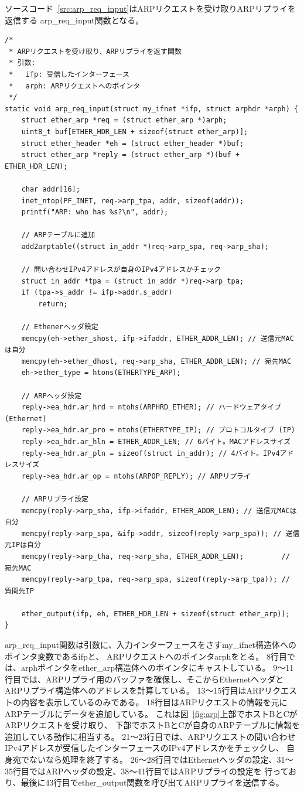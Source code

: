 ソースコード~\ref{src:arp_req_input}はARPリクエストを受け取りARPリプライを返信する
arp\_req\_input関数となる。
\begin{lstlisting}[caption=arp\_req\_input関数,label=src:arp_req_input]
/*
 * ARPリクエストを受け取り、ARPリプライを返す関数
 * 引数:
 *   ifp: 受信したインターフェース
 *   arph: ARPリクエストへのポインタ
 */
static void arp_req_input(struct my_ifnet *ifp, struct arphdr *arph) {
    struct ether_arp *req = (struct ether_arp *)arph;
    uint8_t buf[ETHER_HDR_LEN + sizeof(struct ether_arp)];
    struct ether_header *eh = (struct ether_header *)buf;
    struct ether_arp *reply = (struct ether_arp *)(buf + ETHER_HDR_LEN);

    char addr[16];
    inet_ntop(PF_INET, req->arp_tpa, addr, sizeof(addr));
    printf("ARP: who has %s?\n", addr);

    // ARPテーブルに追加
    add2arptable((struct in_addr *)req->arp_spa, req->arp_sha);

    // 問い合わせIPv4アドレスが自身のIPv4アドレスかチェック
    struct in_addr *tpa = (struct in_addr *)req->arp_tpa;
    if (tpa->s_addr != ifp->addr.s_addr)
        return;

    // Ethenerヘッダ設定
    memcpy(eh->ether_shost, ifp->ifaddr, ETHER_ADDR_LEN); // 送信元MACは自分
    memcpy(eh->ether_dhost, req->arp_sha, ETHER_ADDR_LEN); // 宛先MAC
    eh->ether_type = htons(ETHERTYPE_ARP);

    // ARPヘッダ設定
    reply->ea_hdr.ar_hrd = ntohs(ARPHRD_ETHER); // ハードウェアタイプ (Ethernet)
    reply->ea_hdr.ar_pro = ntohs(ETHERTYPE_IP); // プロトコルタイプ (IP)
    reply->ea_hdr.ar_hln = ETHER_ADDR_LEN; // 6バイト。MACアドレスサイズ
    reply->ea_hdr.ar_pln = sizeof(struct in_addr); // 4バイト。IPv4アドレスサイズ
    reply->ea_hdr.ar_op = ntohs(ARPOP_REPLY); // ARPリプライ

    // ARPリプライ設定
    memcpy(reply->arp_sha, ifp->ifaddr, ETHER_ADDR_LEN); // 送信元MACは自分
    memcpy(reply->arp_spa, &ifp->addr, sizeof(reply->arp_spa)); // 送信元IPは自分
    memcpy(reply->arp_tha, req->arp_sha, ETHER_ADDR_LEN);         // 宛先MAC
    memcpy(reply->arp_tpa, req->arp_spa, sizeof(reply->arp_tpa)); // 質問先IP

    ether_output(ifp, eh, ETHER_HDR_LEN + sizeof(struct ether_arp));
}
\end{lstlisting}
arp\_req\_input関数は引数に、入力インターフェースをさすmy\_ifnet構造体へのポインタ変数であるifpと、
ARPリクエストへのポインタarphをとる。
8行目では、arphポインタをether\_arp構造体へのポインタにキャストしている。
9〜11行目では、ARPリプライ用のバッファを確保し、そこからEthernetヘッダとARPリプライ構造体へのアドレスを計算している。
13〜15行目はARPリクエストの内容を表示しているのみである。
18行目はARPリクエストの情報を元にARPテーブルにデータを追加している。
これは図~\ref{fig:arp}上部でホストBとCがARPリクエストを受け取り、
下部でホストBとCが自身のARPテーブルに情報を追加している動作に相当する。
21〜23行目では、ARPリクエストの問い合わせIPv4アドレスが受信したインターフェースのIPv4アドレスかをチェックし、
自身宛でないなら処理を終了する。
26〜28行目ではEthernetヘッダの設定、31〜35行目ではARPヘッダの設定、38〜41行目ではARPリプライの設定を
行っており、最後に43行目でether\_output関数を呼び出てARPリプライを送信する。

